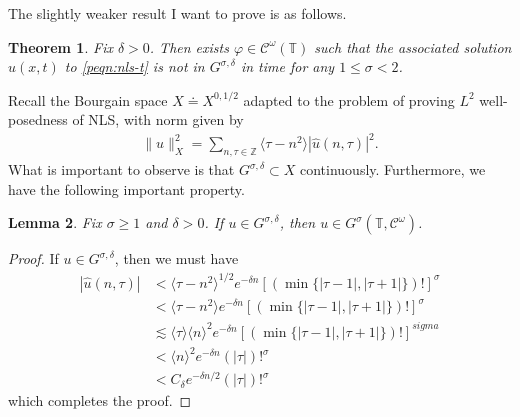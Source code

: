 \documentclass[12pt,reqno]{amsart}
\numberwithin{equation}{section}  %
\newcommand{\zz}{\mathbb{Z}}
\newcommand{\ci}{\mathbb{T}}
\newcommand{\wh}{\widehat}
\newcommand{\vp}{\varphi}
\newtheorem{theorem}{Theorem}[section]
\newtheorem{lemma}[theorem]{Lemma}
\begin{document}
%
%
The slightly weaker result I want to prove
is as follows.
%
\begin{theorem}
  Fix $\delta > 0$. Then exists
  $\vp \in  \mathcal{C}^\omega(\mathbb{T})$ such that the associated solution
  $u(x,t)$ to \eqref{peqn:nls-t} is not in $G^{\sigma, \delta}$
  in time for any $1 \le \sigma < 2$. 
  \label{thm:sharp-weak}
\end{theorem}
%
Recall the Bourgain space $X \doteq X^{0,1/2}$ adapted to the problem of proving
$L^{2}$ well-posedness of
NLS, with norm given by
%
\begin{equation*}
  \begin{split}
    \| u \|_{X}^{2} = \sum_{n, \tau \in \zz} \langle \tau - n^{2} \rangle 
    | \wh{u}(n, \tau) |^{2}.
  \end{split}
\end{equation*}
%
%
What is important to observe is that $G^{\sigma, \delta} \subset X$
continuously. Furthermore, we have the following important property. %
%
%
%
%
%
%
%
\begin{lemma}
  Fix $\sigma \ge 1$ and $\delta > 0$.
  If $u \in G^{\sigma, \delta}$, then $u \in G^{\sigma}(\ci,
  \mathcal{C}^{\omega})$.
  \label{lem:main-space-embed}
\end{lemma}
%
%
%
%
\begin{proof}
  If $u \in G^{\sigma, \delta}$, then we must have
  \begin{equation*}
    \begin{split}
      | \wh{u}(n, \tau) |
      & <  \langle \tau - n^{2} \rangle^{1/2}    e^{-\delta n}
      [(\min \{|\tau -1 |, |\tau + 1|\})!]^{\sigma}
      \\
      & <  \langle \tau - n^{2} \rangle e^{-\delta n}
      [(\min \{ |\tau -1 |, |\tau + 1| \})!]^{\sigma}
      \\
      & \lesssim \langle \tau \rangle \langle n \rangle ^{2}
      e^{-\delta n}
      [(\min \{ |\tau -1 |, |\tau + 1| \})!]^{sigma}
      \\
      & < \langle n \rangle ^{2}
      e^{-\delta n}
      (| \tau |)!^{\sigma}
      \\
      & < C_{\delta} e^{-\delta n/2} (| \tau |)!^{\sigma}
    \end{split}
  \end{equation*}
  which completes the proof.
\end{proof}
%
%
%
%
\end{document}
